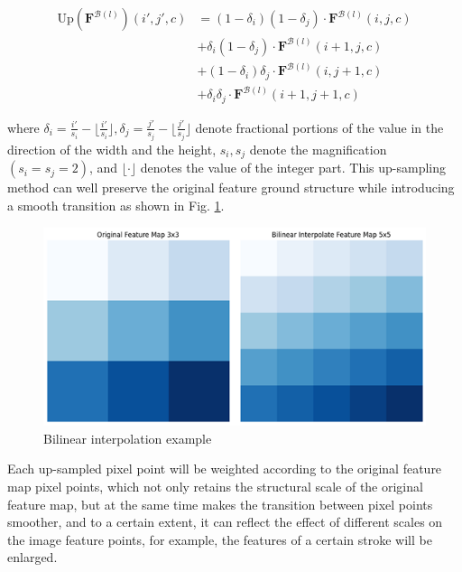 \begin{equation}
\label{eq4}
  \begin{aligned}
    \mbox{Up}(\mathbf{F}^{\mathcal{B}(l)})(i', j', c) &= (1-\delta_i)(1-\delta_j)\cdot \mathbf{F}^{\mathcal{B}(l)}(i, j, c)\\
    &+\delta_i(1-\delta_j)\cdot \mathbf{F}^{\mathcal{B}(l)}(i+1, j, c) \\
    &+(1-\delta_i)\delta_j\cdot \mathbf{F}^{\mathcal{B}(l)}(i, j+1, c) \\
    &+\delta_i \delta_j \cdot \mathbf{F}^{\mathcal{B}(l)}(i+1, j+1, c)
  \end{aligned}
\end{equation}

where $\delta_i=\frac{i'}{s_i} - \lfloor \frac{i'}{s_i} \rfloor, \delta_j = \frac{j'}{s_j} - \lfloor \frac{j'}{s_j} \rfloor$ denote fractional portions of the value in the direction of the width and the height, $s_i,s_j$ denote the magnification $(s_i = s_j = 2)$, and $\lfloor \cdot \rfloor$ denotes the value of the integer part. This up-sampling method can well preserve the original feature ground structure while introducing a smooth transition as shown in Fig. \ref{fig:bilinear}. 

\begin{figure}[htbp]
  \centering
  \includegraphics[scale=0.8]{figure/bilinear.png}
  \caption{Bilinear interpolation example}
  \label{fig:bilinear}
\end{figure}

Each up-sampled pixel point will be weighted according to the original feature map pixel points, which not only retains the structural scale of the original feature map, but at the same time makes the transition between pixel points smoother, and to a certain extent, it can reflect the effect of different scales on the image feature points, for example, the features of a certain stroke will be enlarged.

